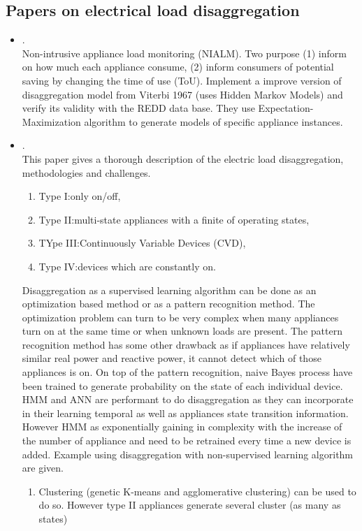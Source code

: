 \subsection{Papers on electrical load disaggregation} 
\begin{itemize}
	\item {}.\\
	 Non-intrusive appliance load monitoring (NIALM). Two purpose (1) inform on how much each appliance consume, (2) inform consumers of potential saving by changing the time of use (ToU). Implement a improve version of disaggregation model from Viterbi 1967 (uses Hidden Markov Models) and verify its validity with the REDD data base. They use Expectation-Maximization algorithm to generate models of specific appliance instances.
	\item {}.\\
	 This paper gives a thorough description of the electric load disaggregation, methodologies and challenges.
	  \begin{enumerate}
	 	\item Type I:\@ only on/off,
	 	\item Type II:\@ multi-state appliances with a finite of operating states,
	 	\item TYpe III:\@ Continuously Variable Devices (CVD),
	 	\item Type IV:\@ devices which are constantly on.
	  \end{enumerate}
	 Disaggregation as a supervised learning algorithm can be done as an optimization based method or as a pattern recognition method. The optimization problem can turn to be very complex when many appliances turn on at the same time or when unknown loads are present. The pattern recognition method has some other drawback as if appliances have relatively similar real power and reactive power, it cannot detect which of those appliances is on. On top of the pattern recognition, naive Bayes process have been trained to generate probability on the state of each individual device.
	 HMM and ANN are performant to do disaggregation as they can incorporate in their learning temporal as well as appliances state transition information. However HMM as exponentially gaining in complexity with the increase of the number of appliance and need to be retrained every time a new device is added.
	 Example using disaggregation with non-supervised learning algorithm are given. 
	 \begin{enumerate}
	 	\item Clustering (genetic K-means and agglomerative clustering) can be used to do so. However type II appliances generate several cluster (as many as states)

\end{enumerate}
\end{itemize}
